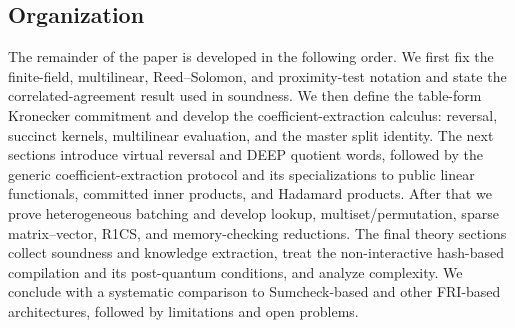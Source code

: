 \subsection{Organization}

The remainder of the paper is developed in the following order.  We first fix the finite-field, multilinear, Reed--Solomon, and proximity-test notation and state the correlated-agreement result used in soundness.  We then define the table-form Kronecker commitment and develop the coefficient-extraction calculus: reversal, succinct kernels, multilinear evaluation, and the master split identity.  The next sections introduce virtual reversal and DEEP quotient words, followed by the generic coefficient-extraction protocol and its specializations to public linear functionals, committed inner products, and Hadamard products.  After that we prove heterogeneous batching and develop lookup, multiset/permutation, sparse matrix--vector, R1CS, and memory-checking reductions.  The final theory sections collect soundness and knowledge extraction, treat the non-interactive hash-based compilation and its post-quantum conditions, and analyze complexity.  We conclude with a systematic comparison to Sumcheck-based and other FRI-based architectures, followed by limitations and open problems.
